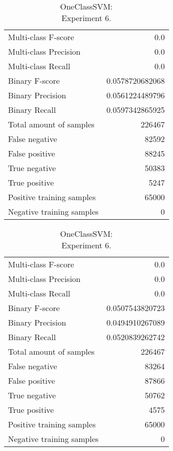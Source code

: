 \begin{table}[H]
\begin{minipage}{0.5\textwidth}
\caption{OneClassSVM: \\Experiment 5.}

\centering
\begin{tabular}{l r}
\toprule
Multi-class F-score & 0.0 \\
Multi-class Precision & 0.0 \\
Multi-class Recall & 0.0 \\
\midrule
Binary F-score & 0.0578720682068 \\
Binary Precision & 0.0561224489796 \\
Binary Recall & 0.0597342865925 \\
\midrule
Total amount of samples & 226467 \\

False negative & 82592 \\
False positive & 88245 \\
True negative & 50383 \\
True positive & 5247 \\
\midrule
Positive training samples & 65000 \\
Negative training samples & 0 \\
\bottomrule
\end{tabular}

\end{minipage}
\hfillx
\begin{minipage}{0.5\textwidth}
\caption{OneClassSVM: \\Experiment 6.}

\centering
\begin{tabular}{l r}
\toprule
Multi-class F-score & 0.0 \\
Multi-class Precision & 0.0 \\
Multi-class Recall & 0.0 \\
\midrule
Binary F-score & 0.0507543820723 \\
Binary Precision & 0.0494910267089 \\
Binary Recall & 0.0520839262742 \\
\midrule
Total amount of samples & 226467 \\

False negative & 83264 \\
False positive & 87866 \\
True negative & 50762 \\
True positive & 4575 \\
\midrule
Positive training samples & 65000 \\
Negative training samples & 0 \\
\bottomrule
\end{tabular}
\end{minipage}
\end{table}

